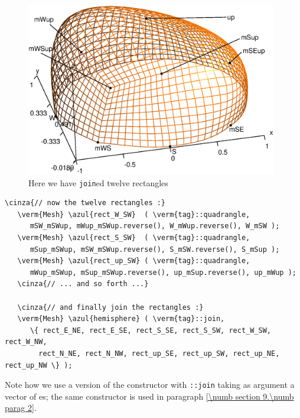 \begin{figure}[ht] \centering
  \includegraphics[width=110mm]{hemisphere-2}
  \caption{Here we have {\small\tt join}ed twelve rectangles}
  \label{\numb section 2.\numb fig 7}
\end{figure}
	
\begin{Verbatim}[commandchars=\\\{\},formatcom=\small\tt,frame=single,
   label=parag-\ref{\numb section 2.\numb parag 7}.cpp,rulecolor=\color{coment},
   baselinestretch=0.94,framesep=2mm]
   \cinza{// now the twelve rectangles :}
   \verm{Mesh} \azul{rect_W_SW}  ( \verm{tag}::quadrangle,
      mSW_mSWup, mWup_mSWup.reverse(), W_mWup.reverse(), W_mSW );
   \verm{Mesh} \azul{rect_S_SW}  ( \verm{tag}::quadrangle,
      mSup_mSWup, mSW_mSWup.reverse(), S_mSW.reverse(), S_mSup );
   \verm{Mesh} \azul{rect_up_SW} ( \verm{tag}::quadrangle,
      mWup_mSWup, mSup_mSWup.reverse(), up_mSup.reverse(), up_mWup );
   \cinza{// ... and so forth ...}

   \cinza{// and finally join the rectangles :}
   \verm{Mesh} \azul{hemisphere} ( \verm{tag}::join,
      \{ rect_E_NE, rect_E_SE, rect_S_SE, rect_S_SW, rect_W_SW, rect_W_NW,
        rect_N_NE, rect_N_NW, rect_up_SE, rect_up_SW, rect_up_NE, rect_up_NW \} );
\end{Verbatim}

Note how we use a version of the {\small\tt {}} constructor with {\small\tt {}::join}
taking as argument a vector of {\small\tt {}}es; the same constructor is used in
paragraph \ref{\numb section 9.\numb parag 2}.

